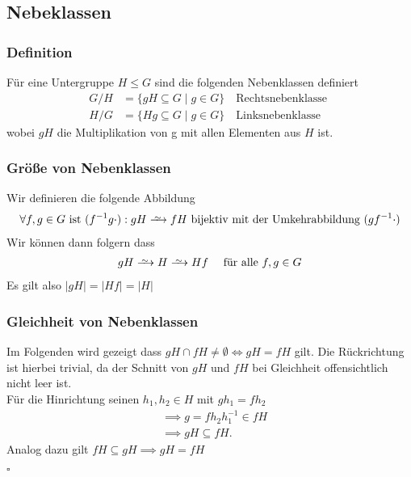 \documentclass[12pt, german]{article}
\newcommand\iso{\xrightarrow{
		\,\smash{\raisebox{-0.65ex}{\ensuremath{\scriptstyle\sim}}}\,}}
\newcommand{\bewiesen}{

\begin{flushright}
		$\square$  \\
\end{flushright}}
\begin{document}
\subsection{Nebeklassen}
\subsubsection{Definition}
		Für eine Untergruppe $H \leq G$ sind die folgenden Nebenklassen definiert
		\begin{align*}
			 G/H &= \{gH \subseteq G \mid g \in G\} \quad \text{Rechtsnebenklasse } \\
			 H/G &= \{Hg \subseteq G \mid g \in G\} \quad \text{Linksnebenklasse } 
		\end{align*}
		wobei $gH$ die Multiplikation von  g mit allen Elementen aus $H$ ist. 

\subsubsection{Größe von Nebenklassen}
		Wir definieren die folgende Abbildung
		\begin{align*}
			\forall f,g \in G \text{ ist } (f^{-1}g \cdot): gH \iso fH \text{ bijektiv mit der Umkehrabbildung } (gf^{-1}\cdot)
		\end{align*}
		Wir können dann folgern dass 
		\begin{align*}
			gH \iso H \iso Hf \quad \text{ für alle } f,g \in G
		\end{align*}
		Es gilt also $|gH| = |Hf| = |H|$

\subsubsection{Gleichheit von Nebenklassen}
		Im Folgenden wird gezeigt dass $gH \cap fH \not = \emptyset \iff gH = fH$ gilt.
		Die Rückrichtung ist hierbei trivial, da der Schnitt von $gH$ und $fH$ bei Gleichheit offensichtlich nicht leer ist. \\
		
		Für die Hinrichtung seinen $h_1, h_2 \in H$ mit $gh_1 = fh_2$
		\begin{align*}
			&\implies g=fh_2h_1^{-1} \in fH \\
			&\implies gH \subseteq fH. 
		\end{align*}
		Analog dazu gilt $fH \subseteq gH \implies gH = fH$
		\bewiesen
		
\end{document}

